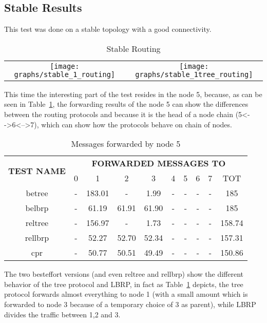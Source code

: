 \documentclass{article}
\begin{document}
	\subsection{Stable Results}
This test was done on a stable topology with a good connectivity.
		\begin{table}[H]
			\centering
			\begin{tabular}{cc}
				\texttt{[image: graphs/stable\_1\_routing]}&\texttt{[image: graphs/stable\_1tree\_routing]}\\
			\end{tabular}
			\caption{Stable Routing}
			\label{tab:comparisonStable}
		\end{table}
This time the interesting part of the test resides in the node 5, because, as can be seen in Table~\ref{tab:comparisonStable}, the forwarding results of the node 5 can show the differences between the routing protocols and because it is the head of a node chain (5\textless-\\-\textgreater6\textless--\textgreater7), which can show how the protocols behave on chain of nodes.
		\begin{table}[H]
			\begin{center}
			    \begin{tabular}{|c|c|c|c|c|c|c|c|c|c|}
				    \hline
				    \multirow{2}{*}{\textbf{TEST NAME}} & \multicolumn{9}{c|}{\textbf{FORWARDED MESSAGES TO}} \\ \cline{2-10}
					& 0 & 1 & 2 & 3 & 4 & 5 & 6 & 7 & TOT \\ \hline
				    betree & - & 183.01 & - & 1.99 & - & - & - & - & 185 \\ \hline
				    belbrp & - & 61.19 & 61.91 & 61.90 & - & - & - & - & 185 \\ \hline
				    reltree & - & 156.97 & - & 1.73 & - & - & - & - & 158.74 \\ \hline
   				    rellbrp & - & 52.27 & 52.70 & 52.34 & - & - & - & - & 157.31 \\ \hline
				    cpr & - & 50.77 & 50.51 & 49.49 & - & - & - & - & 150.86 \\ \hline
			    \end{tabular}
			\end{center}	
			\caption{Messages forwarded by node 5}
			\label{tab:stableF5}
		\end{table}
The two besteffort versions (and even reltree and rellbrp) show the different behavior of the tree protocol and LBRP, in fact as Table~\ref{tab:comparisonStable} depicts, the tree protocol forwards almost everything to node 1 (with a small amount which is forwarded to node 3 because of a temporary choice of 3 as parent), while LBRP divides the traffic between 1,2 and 3.
\end{document}
